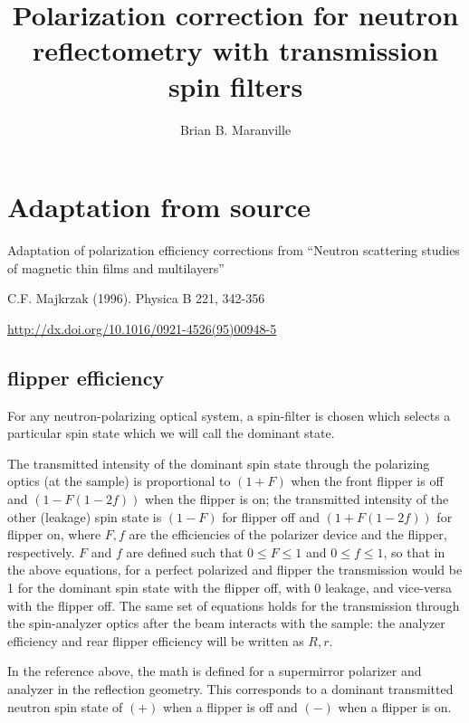 \documentclass[12pt,letterpaper]{article}
\author{Brian B. Maranville}
\title{Polarization correction for neutron reflectometry with transmission spin filters}
\begin{document}
\maketitle

\section{Adaptation from source}
Adaptation of polarization efficiency corrections from 
``Neutron scattering studies of magnetic thin films and multilayers''

C.F. Majkrzak (1996). Physica B 221, 342-356

\url{http://dx.doi.org/10.1016/0921-4526(95)00948-5}
\subsection{flipper efficiency}
For any neutron-polarizing optical system, a spin-filter is chosen which selects a particular spin
state which we will call the dominant state.

The transmitted intensity of the dominant spin state through the polarizing optics (at the sample)
is proportional to $(1 + F)$ when the front flipper is off and $(1 - F(1 - 2f))$ when the flipper is on; 
the transmitted intensity of the other (leakage) spin state is $(1 - F)$ for flipper off and $(1 + F(1 - 2f))$
for flipper on, where $F, f$ are the efficiencies of the polarizer device and the flipper, respectively.
$F$ and $f$ are defined such that $0 \leq F \leq 1$ and $0 \leq f \leq 1$, so that in the above
equations, for a perfect polarized and flipper the transmission would be 1 for the dominant spin state
with the flipper off, with 0 leakage, and vice-versa with the flipper off.  The same set of equations holds
for the transmission through the spin-analyzer optics after the beam interacts with the sample: the analyzer
efficiency and rear flipper efficiency will be written as $R, r$.

In the reference above, the math is defined for a supermirror polarizer and analyzer in the reflection geometry.
This corresponds to a dominant transmitted neutron spin state of $(+)$ when a flipper is 
off and $(-)$ when a flipper is on.
\end{document}
